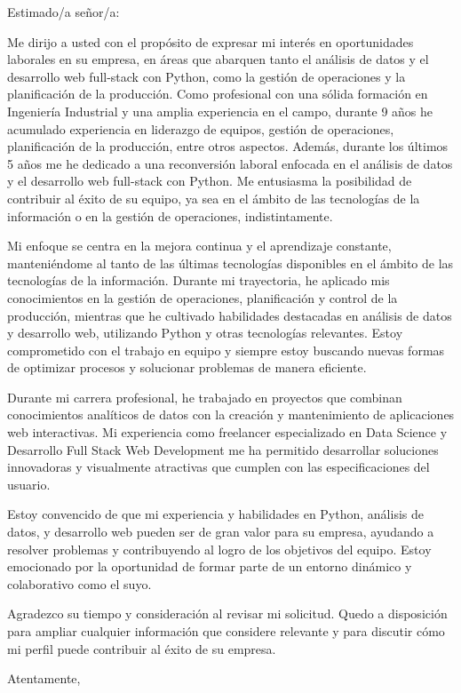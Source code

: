 \documentclass{letter}
\begin{document}
	
	\begin{letter}{}
		
		\opening{Estimado/a señor/a:}
		
		Me dirijo a usted con el propósito de expresar mi interés en oportunidades laborales en su empresa, en áreas que abarquen tanto el análisis de datos y el desarrollo web full-stack con Python, como la gestión de operaciones y la planificación de la producción. Como profesional con una sólida formación en Ingeniería Industrial y una amplia experiencia en el campo, durante 9 años he acumulado experiencia en liderazgo de equipos, gestión de operaciones, planificación de la producción, entre otros aspectos. Además, durante los últimos 5 años me he dedicado a una reconversión laboral enfocada en el análisis de datos y el desarrollo web full-stack con Python. Me entusiasma la posibilidad de contribuir al éxito de su equipo, ya sea en el ámbito de las tecnologías de la información o en la gestión de operaciones, indistintamente.
		
		Mi enfoque se centra en la mejora continua y el aprendizaje constante, manteniéndome al tanto de las últimas tecnologías disponibles en el ámbito de las tecnologías de la información. Durante mi trayectoria, he aplicado mis conocimientos en la gestión de operaciones, planificación y control de la producción, mientras que he cultivado habilidades destacadas en análisis de datos y desarrollo web, utilizando Python y otras tecnologías relevantes. Estoy comprometido con el trabajo en equipo y siempre estoy buscando nuevas formas de optimizar procesos y solucionar problemas de manera eficiente.
		
		Durante mi carrera profesional, he trabajado en proyectos que combinan conocimientos analíticos de datos con la creación y mantenimiento de aplicaciones web interactivas. Mi experiencia como freelancer especializado en Data Science y Desarrollo Full Stack Web Development me ha permitido desarrollar soluciones innovadoras y visualmente atractivas que cumplen con las especificaciones del usuario.
		
		Estoy convencido de que mi experiencia y habilidades en Python, análisis de datos, y desarrollo web pueden ser de gran valor para su empresa, ayudando a resolver problemas y contribuyendo al logro de los objetivos del equipo. Estoy emocionado por la oportunidad de formar parte de un entorno dinámico y colaborativo como el suyo.
		
		Agradezco su tiempo y consideración al revisar mi solicitud. Quedo a disposición para ampliar cualquier información que considere relevante y para discutir cómo mi perfil puede contribuir al éxito de su empresa.
		
		\closing{Atentamente,}
		
	\end{letter}
\end{document}
